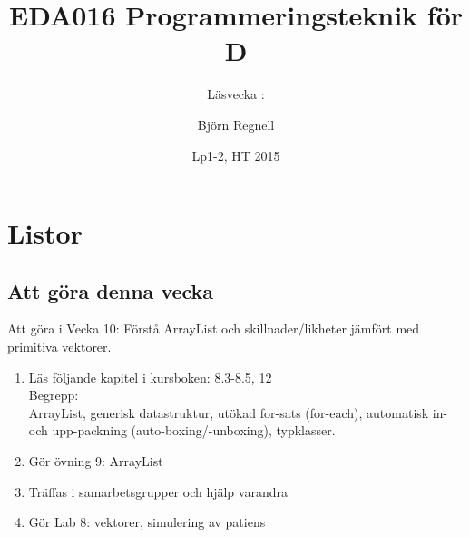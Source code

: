 \documentclass{lecturenotes}
\title[Föreläsningsanteckningar EDA016, 2015]{EDA016 Programmeringsteknik för D}
\subtitle{Läsvecka \vecka: \tema}
\author{Björn Regnell}
\institute{Datavetenskap, LTH}
\date{Lp1-2, HT 2015}
\renewcommand{\vecka}{10}
\newcommand{\tema}{Listor}
\begin{document}
\frame{\titlepage}
\setnextsection{\vecka}
\section[Vecka \vecka: \tema]{\tema}
\frame{\tableofcontents}

\subsection{Att göra denna vecka}
\begin{Slide}{Att göra i Vecka \vecka: Förstå ArrayList och skillnader/likheter jämfört med primitiva vektorer.}
\begin{enumerate}
\item Läs följande kapitel i kursboken:  8.3-8.5, 12 \\  
Begrepp: \\ArrayList, generisk datastruktur, utökad for-sats (for-each), automatisk in- och upp-packning (auto-boxing/-unboxing), typklasser.
\item Gör övning 9: ArrayList
\item Träffas i samarbetsgrupper och hjälp varandra 
\item Gör Lab 8: vektorer, simulering av patiens
\end{enumerate}
\end{Slide}
\end{document}
